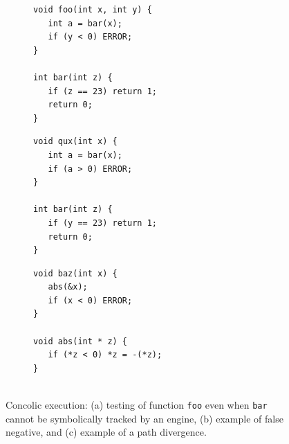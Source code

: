 \begin{figure}[t]
  \begin{subfigure}[t]{.33\textwidth}
    \begin{lstlisting}[basicstyle=\ttfamily\scriptsize]
void foo(int x, int y) {
   int a = bar(x);
   if (y < 0) ERROR;
} 

int bar(int z) {
   if (z == 23) return 1;
   return 0;
}
    \end{lstlisting}
    \vspace{-4mm}
    \caption{}
  \end{subfigure}%
  \begin{subfigure}[t]{.33\textwidth}
    \begin{lstlisting}[basicstyle=\ttfamily\scriptsize]
void qux(int x) {
   int a = bar(x);
   if (a > 0) ERROR;
} 

int bar(int z) {
   if (y == 23) return 1;
   return 0;
}
    \end{lstlisting}
    \vspace{-4mm}
    \caption{}
  \end{subfigure}%
  \begin{subfigure}[t]{.33\textwidth}
    \begin{lstlisting}[basicstyle=\ttfamily\scriptsize]
void baz(int x) {
   abs(&x);
   if (x < 0) ERROR;
} 

void abs(int * z) {
   if (*z < 0) *z = -(*z);
}
  
    \end{lstlisting}
    \vspace{-1mm}
    \caption{}
  \end{subfigure}%

  \vspace{-2mm}
  \caption{Concolic execution: (a) testing of function {\tt foo} even when {\tt bar} cannot be symbolically tracked by an engine, (b) example of false negative, and (c) example of a path divergence.
   }
  \label{fig:example-concolic-problems}
  \vspace{-3mm}
\end{figure}

